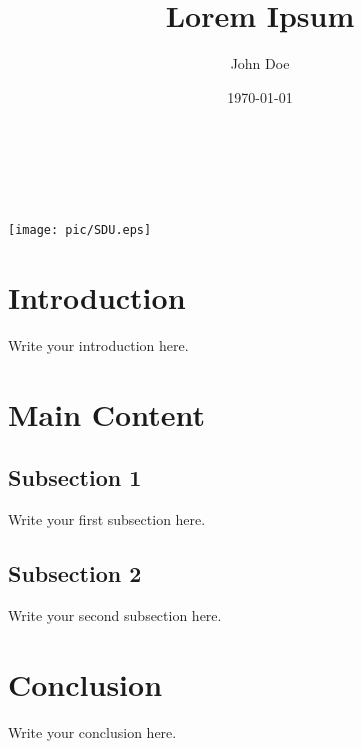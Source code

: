 \documentclass[12pt]{article}
\title{Lorem Ipsum}
\author{John Doe}
\date{\today}
\makeatletter
\let\theauthor\@author
\let\thedate\@date
\let\thetitle\@title
\makeatother
\begin{document}
\begin{titlepage}
    \begin{center}
        \vspace*{5cm}
        {\LARGE \textbf{\thetitle}} \\[1.5cm]
        {\large \theauthor} \\[0.5cm]
        {\large \thedate} \\[3cm]

        \texttt{[image: pic/SDU.eps]}
        
        \vfill

    \end{center}
\end{titlepage}

\tableofcontents
\newpage

\section{Introduction}
Write your introduction here.

\section{Main Content}
\subsection{Subsection 1}
Write your first subsection here.

\subsection{Subsection 2}
Write your second subsection here.

\section{Conclusion}
Write your conclusion here.
\end{document}
